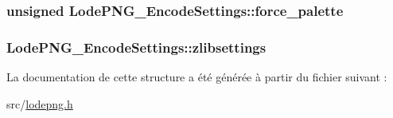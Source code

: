 \subsubsection[{force\+\_\+palette}]{\setlength{\rightskip}{0pt plus 5cm}unsigned Lode\+P\+N\+G\+\_\+\+Encode\+Settings\+::force\+\_\+palette}\label{struct_lode_p_n_g___encode_settings_a44de1047cd9f3bfd55bf8c5313620065}
\hypertarget{struct_lode_p_n_g___encode_settings_addba4b351da6bace64c02a264be74f53}{}
\subsubsection[{zlibsettings}]{ Lode\+P\+N\+G\+\_\+\+Encode\+Settings\+::zlibsettings}\label{struct_lode_p_n_g___encode_settings_addba4b351da6bace64c02a264be74f53}


La documentation de cette structure a été générée à partir du fichier suivant \+:\begin{DoxyCompactItemize}
\item 
src/\hyperlink{lodepng_8h}{lodepng.\+h}\end{DoxyCompactItemize}
